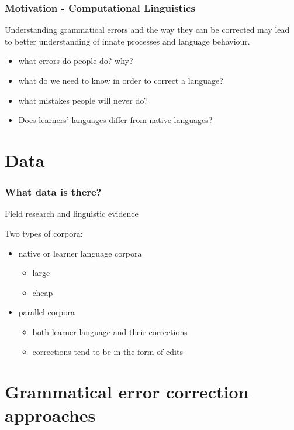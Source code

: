 \documentclass{beamer}
\begin{document}
\begin{frame}
	\frametitle{Motivation - Computational Linguistics}
	Understanding grammatical errors and the way they can be corrected may lead to better understanding of innate processes and language behaviour.
	\begin{itemize}
		\item what errors do people do? why?
		\item what do we need to know in order to correct a language?
		\item what mistakes people will never do?
		\item Does learners' languages differ from native languages? 
	\end{itemize}
\end{frame}
\section{Data}
\begin{frame}
	\frametitle{What data is there?}
	Field research and linguistic evidence
	
	Two types of corpora:
	\begin{itemize}
		\item native or learner language corpora
		\begin{itemize}
			\item large 
			\item cheap 
		\end{itemize}
		\item parallel corpora
		\begin{itemize}
			\item both learner language and their corrections \item corrections tend to be in the form of edits
		\end{itemize}
	\end{itemize}
\end{frame}
\section{Grammatical error correction approaches}
\end{document}
